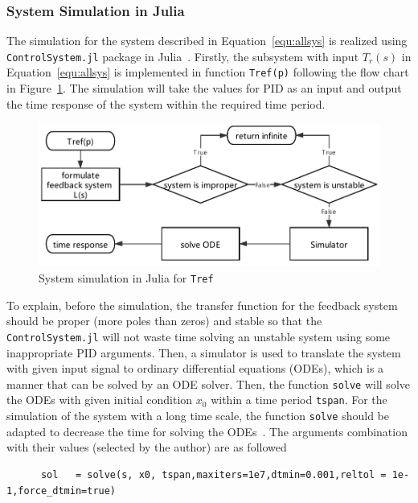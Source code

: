 \documentclass[11pt,oneside,onecolumn,openright]{article}
\begin{document}
  \subsubsection{System Simulation in Julia}
  The simulation for the system described in Equation~\eqref{equ:allsys} is realized using \verb|ControlSystem.jl| package in Julia~\cite{Carlson2016ControlSystemsjlA}. Firstly, the subsystem with input $T_r(s)$ in Equation~\eqref{equ:allsys} is implemented in function \verb|Tref(p)| following the flow chart in Figure~\ref{fig:system}. The simulation will take the values for PID as an input and output the time response of the system within the required time period.
    \begin{figure}[t]
    \centering
    \includegraphics[width=13cm]{fig/system.pdf}
    \cprotect\caption{System simulation in Julia for \verb|Tref|}
    \label{fig:system}
    \end{figure}

  To explain, before the simulation, the transfer function for the feedback system should be proper (more poles than zeros) and stable so that the \verb|ControlSystem.jl| will not waste time solving an unstable system using some inappropriate PID arguments. Then, a simulator is used to translate the system with given input signal to ordinary differential equations (ODEs), which is a manner that can be solved by an ODE solver. Then, the function \verb|solve| will solve the ODEs with given initial condition $x_0$ within a time period \verb|tspan|. For the simulation of the system with a long time scale, the function \verb|solve| should be adapted to decrease the time for solving the ODEs~\cite{rackauckas2017differentialequations}. The arguments combination with their values (selected by the author) are as followed
  \begin{verbatim}
      sol   = solve(s, x0, tspan,maxiters=1e7,dtmin=0.001,reltol = 1e-1,force_dtmin=true)
      \end{verbatim}
\end{document}
